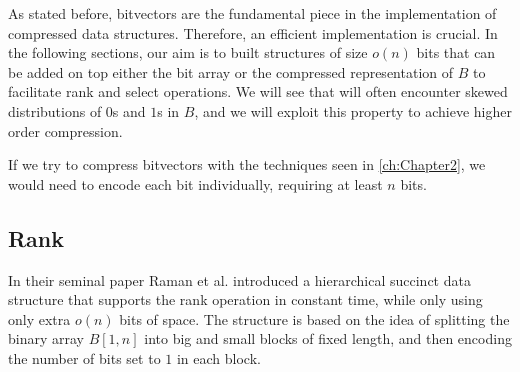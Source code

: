 \begin{example}

\end{example}
 \vspace{0.4cm}

\noindent As stated before, bitvectors are the fundamental piece in the implementation of compressed data structures. Therefore, an efficient implementation is crucial. In the following sections, our aim is to built structures of size $o(n)$ bits that can be added on top either the bit array or the compressed representation of $B$ to facilitate rank and select operations. We will see that will often encounter skewed distributions of $0$s and $1$s in $B$, and we will exploit this property to achieve higher order compression.

\begin{remark}
    If we try to compress bitvectors with the techniques seen in \autoref{ch:Chapter2}, we would need to encode each bit individually, requiring at least $n$ bits.
\end{remark}

\subsection{Rank} \label{subsec:rank}

In their seminal paper \cite{RRR2002} Raman et al. introduced a hierarchical succinct data structure that supports the rank operation in constant time, while only using only extra $o(n)$  bits of space. The structure is based on the idea of splitting the binary array $B[1, n]$ into big and small blocks of fixed length, and then encoding the number of bits set to $1$ in each block. \vspace{0.4cm}

